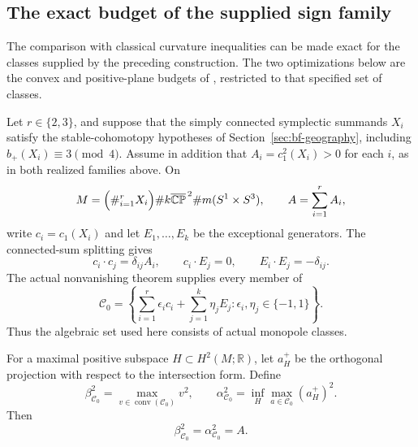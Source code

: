 \subsection{The exact budget of the supplied sign family}
\label{sec:bf-budget-comparison}

The comparison with classical curvature inequalities can be made exact
for the classes supplied by the preceding construction.  The two
optimizations below are the convex and positive-plane budgets of
\cite{LeBrunConvex}, restricted to that specified set of classes.

Let $r\in\{2,3\}$, and suppose that the simply connected symplectic
summands $X_i$ satisfy the stable-cohomotopy hypotheses of
Section~\ref{sec:bf-geography}, including $b_+(X_i)\equiv3\pmod4$.
Assume in addition that $A_i=c_1^2(X_i)>0$ for each $i$, as in both
realized families above.  On
\[
 M=\Bigl(\#_{i=1}^rX_i\Bigr)\#k\overline{\mathbb{CP}}^{\,2}
                         \#m(S^1\times S^3),
 \qquad A=\sum_{i=1}^rA_i,
\]
write $c_i=c_1(X_i)$ and let $E_1,\ldots,E_k$ be the exceptional
generators.  The connected-sum splitting gives
\[
 c_i\cdot c_j=\delta_{ij}A_i,\qquad
 c_i\cdot E_j=0,\qquad E_i\cdot E_j=-\delta_{ij}.
\]
The actual nonvanishing theorem supplies every member of
\begin{equation}\label{eq:bf-supplied-sign-set}
 \mathcal C_0=
 \left\{\sum_{i=1}^r\epsilon_i c_i+
              \sum_{j=1}^k\eta_jE_j:
             \epsilon_i,\eta_j\in\{-1,1\}\right\}.
\end{equation}
Thus the algebraic set used here consists of actual monopole classes.

\begin{proposition}
\label{prop:bf-sign-budgets}
For a maximal positive subspace $H\subset H^2(M;\mathbb R)$, let
$a_H^+$ be the orthogonal projection with respect to the intersection
form.  Define
\[
 \beta_{\mathcal C_0}^2
    =\max_{v\in\operatorname{conv}(\mathcal C_0)}v^2,
 \qquad
 \alpha_{\mathcal C_0}^2
    =\inf_H\max_{a\in\mathcal C_0}(a_H^+)^2.
\]
Then
\begin{equation}\label{eq:bf-sign-budgets}
 \beta_{\mathcal C_0}^2=\alpha_{\mathcal C_0}^2=A.
\end{equation}
\end{proposition}

